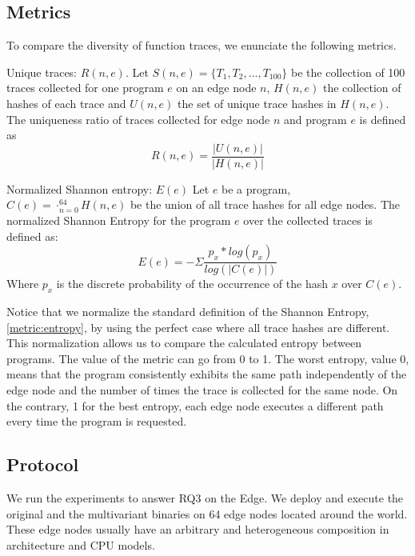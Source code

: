 \subsection*{Metrics}

To compare the diversity of function traces, we enunciate the following metrics.  


\begin{metric}{Unique traces: $R(n, e)$.}\label{metric:ratio:mve}
    Let $S(n, e)=\{T_1, T_2, ..., T_{100}\}$ be the collection of 100 traces collected for one program $e$ on an edge node $n$, $H(n, e)$ the collection of hashes of each trace and $U(n, e)$ the set of unique trace hashes in $H(n,e)$.
    The uniqueness ratio of traces collected for edge node $n$ and program $e$ is defined as
    $$
        R(n,e) = \frac{|U(n,e)|}{|H(n, e)|}
    $$
\end{metric}


\begin{metric}{Normalized Shannon entropy: $E(e)$}\label{metric:entropy}
    Let $e$ be a program, $C(e)=\cdot_{n=0}^{64} H(n, e)$ be the union  of all trace hashes for all edge nodes.
    The normalized Shannon Entropy for the program $e$ over the collected traces is defined as: \\
    $$
        E(e)=-\Sigma \frac{p_x*log(p_x)}{log(|C(e)|)}
    $$
    Where $p_x$ is the discrete probability of the occurrence of the hash $x$ over $C(e)$.
    
\end{metric}

Notice that we normalize the standard definition of the Shannon Entropy, \autoref{metric:entropy}, by using the perfect case where all trace hashes are different. 
This normalization allows us to compare the calculated entropy between programs.
The value of the metric can go from 0 to 1. The worst entropy, value 0, means that the program consistently exhibits the same path independently of the edge node and the number of times the trace is collected for the same node. On the contrary, 1 for the best entropy, each edge node executes a different path every time the program is requested.

\subsection*{Protocol}


We run the experiments to answer RQ3 on the Edge. We deploy and execute the original and the multivariant binaries on 64 edge nodes located around the world.
These edge nodes usually have an arbitrary and heterogeneous composition in architecture and CPU models.

